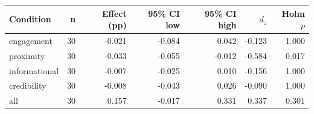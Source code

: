 \begin{tabular}{lrrrrrr}
\toprule
Condition & n & Effect (pp) & 95\% CI low & 95\% CI high & $d_z$ & Holm $p$ \\
\midrule
engagement & 30 & -0.021 & -0.084 & 0.042 & -0.123 & 1.000 \\
proximity & 30 & -0.033 & -0.055 & -0.012 & -0.584 & 0.017 \\
informational & 30 & -0.007 & -0.025 & 0.010 & -0.156 & 1.000 \\
credibility & 30 & -0.008 & -0.043 & 0.026 & -0.090 & 1.000 \\
all & 30 & 0.157 & -0.017 & 0.331 & 0.337 & 0.301 \\
\bottomrule
\end{tabular}
